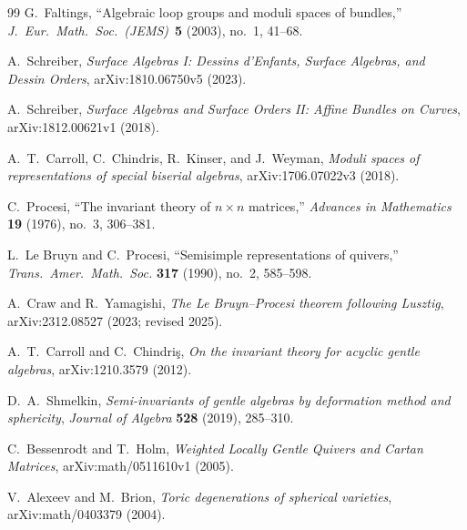 \documentclass[11pt,oneside]{amsbook}
\numberwithin{equation}{section}
\theoremstyle{plain}
\theoremstyle{definition}
\theoremstyle{remark}
\begin{document}
\begin{thebibliography}{99}
G.~Faltings,
\newblock ``Algebraic loop groups and moduli spaces of bundles,''
\newblock \emph{J.\ Eur.\ Math.\ Soc.\ (JEMS)}\ \textbf{5} (2003), no.~1, 41--68.

A.~Schreiber,
\newblock \emph{Surface Algebras I: Dessins d'Enfants, Surface Algebras, and Dessin Orders},
\newblock arXiv:1810.06750v5 (2023).

A.~Schreiber,
\newblock \emph{Surface Algebras and Surface Orders II: Affine Bundles on Curves},
\newblock arXiv:1812.00621v1 (2018).

A.~T.~Carroll, C.~Chindris, R.~Kinser, and J.~Weyman,
\newblock \emph{Moduli spaces of representations of special biserial algebras},
\newblock arXiv:1706.07022v3 (2018).






C.~Procesi,
\newblock ``The invariant theory of $n\times n$ matrices,''
\newblock \emph{Advances in Mathematics} \textbf{19} (1976), no.~3, 306--381.

L.~Le Bruyn and C.~Procesi,
\newblock ``Semisimple representations of quivers,''
\newblock \emph{Trans.\ Amer.\ Math.\ Soc.} \textbf{317} (1990), no.~2, 585--598.

A.~Craw and R.~Yamagishi,
\newblock \emph{The Le Bruyn--Procesi theorem following Lusztig},
\newblock arXiv:2312.08527 (2023; revised 2025).

A.~T.~Carroll and C.~Chindri\c{s},
\newblock \emph{On the invariant theory for acyclic gentle algebras},
\newblock arXiv:1210.3579 (2012).

D.~A.~Shmelkin,
\newblock \emph{Semi-invariants of gentle algebras by deformation method and sphericity},
\newblock \emph{Journal of Algebra} \textbf{528} (2019), 285--310.

C.~Bessenrodt and T.~Holm,
\newblock \emph{Weighted Locally Gentle Quivers and Cartan Matrices},
\newblock arXiv:math/0511610v1 (2005).

V.~Alexeev and M.~Brion,
\newblock \emph{Toric degenerations of spherical varieties},
\newblock arXiv:math/0403379 (2004).


\end{thebibliography}
\end{document}
